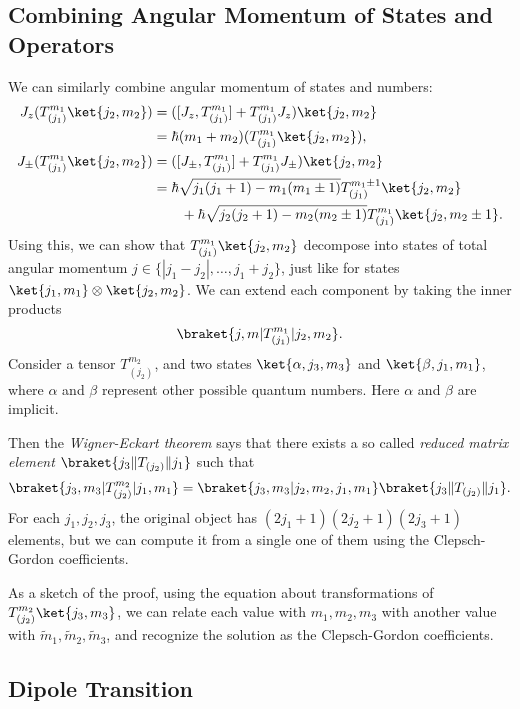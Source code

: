 \documentclass[12pt]{article}
\begin{document}

\subsection{Combining Angular Momentum of States and Operators}
\label{sub:comb_ang_mom}

We can similarly combine angular momentum of states and numbers:
\begin{align*}
	J_z(T_{(j_1)}^{m_1} \ket{j_2, m_2}) &= ([J_z, T_{(j_1)}^{m_1}] + T_{(j_1)}^{m_1} J_z) \ket{j_2, m_2} \\
					    &= \hbar (m_1 + m_2) (T_{(j_1)}^{m_1} \ket{j_2, m_2}), \\
	J_{\pm}(T_{(j_1)}^{m_1} \ket{j_2,m_2}) &= ([J_{\pm}, T_{(j_1)}^{m_1}] + T_{(j_1)}^{m_1} J_{\pm} ) \ket{j_2, m_2} \\
					       &= \hbar \sqrt{j_1(j_1+1)-m_1(m_1\pm1)}T_{(j_1)}^{m_1\pm 1} \ket{j_2, m_2} \\
					       &\qquad + \hbar\sqrt{j_2(j_2+1)-m_2(m_2\pm1)}T_{(j_1)}^{m_1}\ket{j_2,m_2\pm1}.
\end{align*}
Using this, we can show that $T_{(j_1)}^{m_1} \ket{j_2, m_2}$ decompose into states of total angular momentum $j \in \{|j_1-j_2|, \ldots, j_1 + j_2\}$, just like for states $\ket{j_1, m_1} \otimes \ket{j_2, m_2}$. We can extend each component by taking the inner products
\[
	\braket{j,m|T_{(j_1)}^{m_1}|j_2, m_2}.
\]
Consider a tensor $T_{(j_2)}^{m_2}$, and two states $\ket{\alpha, j_3, m_3}$ and $\ket{\beta, j_1, m_1}$, where $\alpha$ and $\beta$ represent other possible quantum numbers. Here $\alpha$ and $\beta$ are implicit.

Then the \emph{Wigner-Eckart theorem} says that there exists a so called \emph{reduced matrix element} $\braket{j_3 \|T_{(j_2)}\| j_1}$ such that
\[
	\braket{j_3, m_3|T_{(j_2)}^{m_2}|j_1,m_1} = \braket{j_3,m_3|j_2,m_2,j_1,m_1} \braket{j_3\|T_{(j_2)}\|j_1}.
\]
For each $j_1, j_2, j_3$, the original object has $(2j_1+1)(2j_2+1)(2j_3+1)$ elements, but we can compute it from a single one of them using the Clepsch-Gordon coefficients.

As a sketch of the proof, using the equation about transformations of $T_{(j_2)}^{m_2} \ket{j_3, m_3}$, we can relate each value with $m_1, m_2, m_3$ with another value with $\tilde m_1, \tilde m_2, \tilde m_3$, and recognize the solution as the Clepsch-Gordon coefficients.

\subsection{Dipole Transition}
\label{sub:dip_trans}
\end{document}
